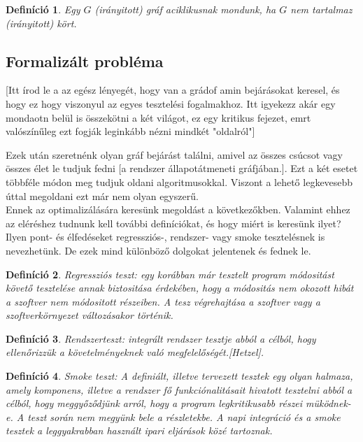 \documentclass[12pt]{article}
\newtheorem{defin}{Definíció}[section]
\begin{document}
\begin{defin}
Egy $G$ (irányitott) gráf aciklikusnak mondunk, ha $G$ nem tartalmaz (irányitott) kört. ~\cite{szam:Fleiner}
\end{defin}

\subsection{Formalizált probléma}
[Itt írod le a az egész lényegét, hogy van a grádof amin bejárásokat keresel, és hogy ez hogy viszonyul az egyes tesztelési fogalmakhoz. Itt igyekezz akár egy mondaotn belül is összekötni a két világot, ez egy kritikus fejezet, emrt valószínűleg ezt fogják leginkább nézni mindkét "oldalról"]

Ezek után szeretnénk olyan gráf bejárást találni, amivel az összes csúcsot vagy összes élet le tudjuk fedni [a rendszer állapotátmeneti gráfjában.].
Ezt a két esetet többféle módon meg tudjuk oldani algoritmusokkal.
Viszont a lehető legkevesebb úttal megoldani ezt már nem olyan egyszerű.\\
Ennek az optimalizálására keresünk megoldást a következőkben.
Valamint ehhez az eléréshez tudnunk kell további definíciókat, és hogy miért is keresünk ilyet?
Ilyen pont- és élfedéseket regressziós-, rendszer- vagy smoke tesztelésnek is nevezhetünk. De ezek mind különböző dolgokat jelentenek és fednek le.\\

\begin{defin}
Regressziós teszt: egy korábban már tesztelt program módositást követő tesztelése annak biztositása érdekében, hogy a módositás nem okozott hibát a szoftver nem módositott részeiben. A tesz végrehajtása a szoftver vagy a szoftverkörnyezet változásakor történik. ~\cite{htb:masterfield}
\end{defin}

\begin{defin}
Rendszerteszt: integrált rendszer tesztje abból a célból, hogy ellenőrizzük a követelményeknek való megfelelőségét.[Hetzel]. ~\cite{htb:masterfield}
\end{defin}

\begin{defin}
Smoke teszt: A definiált, illetve tervezett tesztek egy olyan halmaza, amely komponens, illetve a rendszer fő funkciónalitásait hivatott tesztelni abból a célból, hogy meggyőződjünk arról, hogy a program legkritikusabb részei müködnek-e. A teszt során nem megyünk bele a részletekbe. A napi integráció és a smoke tesztek a leggyakrabban használt ipari eljárások közé tartoznak. ~\cite{htb:masterfield}
\end{defin}
\end{document}
